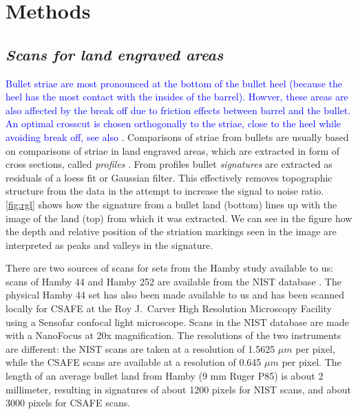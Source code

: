 \documentclass[12pt]{article}
\begin{document}
\hypertarget{methods}{%
\section*{Methods}\label{methods}}

\hypertarget{scans-for-land-engraved-areas}{%
\subsection*{\texorpdfstring{\emph{Scans for land engraved
areas}}{Scans for land engraved areas}}\label{scans-for-land-engraved-areas}}

{\textcolor{blue}{Bullet striae are most pronounced at the bottom of the bullet heel (because the heel has the most contact with the insides of the barrel). Howver, these areas are also affected by the break off due to friction effects between barrel and the bullet. An optimal crosscut is chosen orthogonally to the striae, close to the heel while avoiding break off, see also \citep{aoas}}}.
Comparisons of striae from bullets are usually based on comparisons of
striae in land engraved areas, which are extracted in form of cross
sections, called \emph{profiles} \citep{aoas,ma2004}. From profiles
bullet \emph{signatures} \citep{chu2013,aoas} are extracted as residuals
of a loess fit or Gaussian filter. This effectively removes topographic
structure from the data in the attempt to increase the signal to noise
ratio. \autoref{fig:rgl} shows how the signature from a bullet land
(bottom) lines up with the image of the land (top) from which it was
extracted. We can see in the figure how the depth and relative position
of the striation markings seen in the image are interpreted as peaks and
valleys in the signature.

There are two sources of scans for sets from the Hamby study available
to us: scans of Hamby 44 and Hamby 252 are available from the NIST
database \citep{nist}. The physical Hamby 44 set has also been made
available to us and has been scanned locally for CSAFE at the Roy
J.~Carver High Resolution Microscopy Facility using a Sensofar confocal
light microscope. Scans in the NIST database are made with a NanoFocus
at 20x magnification. The resolutions of the two instruments are
different: the NIST scans are taken at a resolution of 1.5625 \(\mu m\)
per pixel, while the CSAFE scans are available at a resolution of 0.645
\(\mu m\) per pixel. The length of an average bullet land from Hamby (9
mm Ruger P85) is about 2 millimeter, resulting in signatures of about
1200 pixels for NIST scans, and about 3000 pixels for CSAFE scans.
\end{document}
